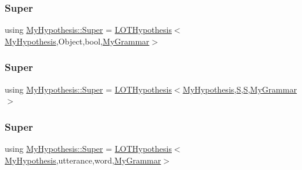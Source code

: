\mbox{\label{class_my_hypothesis_af34a1c11e5b0aae4a52b54bfdd7a0617}} 
\subsubsection{\texorpdfstring{Super}{Super}\hspace{0.1cm}{\footnotesize\ttfamily [2/5]}}
{\footnotesize\ttfamily using \hyperlink{class_my_hypothesis_a266742f266abc638ddc1d1870d735313}{My\+Hypothesis\+::\+Super} =  \hyperlink{class_l_o_t_hypothesis}{L\+O\+T\+Hypothesis}$<$\hyperlink{class_my_hypothesis}{My\+Hypothesis},Object,bool,\hyperlink{class_my_grammar}{My\+Grammar}$>$}

\mbox{\label{class_my_hypothesis_ae5fab2ea7ef7729968ac60a2ce267168}} 
\subsubsection{\texorpdfstring{Super}{Super}\hspace{0.1cm}{\footnotesize\ttfamily [3/5]}}
{\footnotesize\ttfamily using \hyperlink{class_my_hypothesis_a266742f266abc638ddc1d1870d735313}{My\+Hypothesis\+::\+Super} =  \hyperlink{class_l_o_t_hypothesis}{L\+O\+T\+Hypothesis}$<$\hyperlink{class_my_hypothesis}{My\+Hypothesis},\hyperlink{_models_2_formal_language_theory-_complex_2main_8cpp_a51c40915539205f0b5add30b0d68a4cb}{S},\hyperlink{_models_2_formal_language_theory-_complex_2main_8cpp_a51c40915539205f0b5add30b0d68a4cb}{S},\hyperlink{class_my_grammar}{My\+Grammar}$>$}

\mbox{\label{class_my_hypothesis_a1c1cfa95f1a49b273f8a93b3246342e6}} 
\subsubsection{\texorpdfstring{Super}{Super}\hspace{0.1cm}{\footnotesize\ttfamily [4/5]}}
{\footnotesize\ttfamily using \hyperlink{class_my_hypothesis_a266742f266abc638ddc1d1870d735313}{My\+Hypothesis\+::\+Super} =  \hyperlink{class_l_o_t_hypothesis}{L\+O\+T\+Hypothesis}$<$\hyperlink{class_my_hypothesis}{My\+Hypothesis},utterance,word,\hyperlink{class_my_grammar}{My\+Grammar}$>$}

